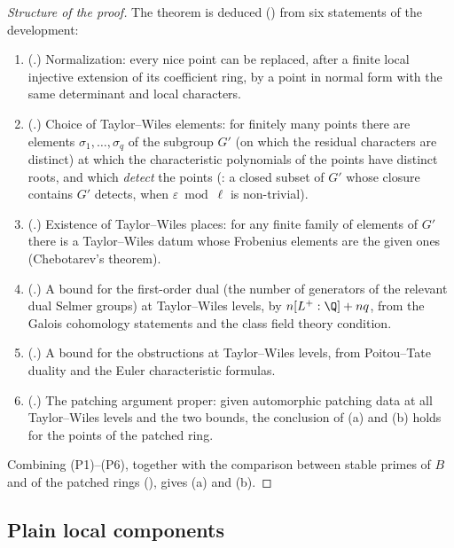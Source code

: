 \begin{proof}[Structure of the proof]
The theorem is deduced () from six statements of the development:
\begin{enumerate}[label=(P\arabic*)]
\item (.) Normalization: every nice point can be replaced, after a finite local injective extension of its coefficient
ring, by a point in normal form with the same determinant and local characters.
\item (.) Choice of Taylor--Wiles elements: for finitely many points there are elements $\sigma_1,\dots,\sigma_q$ of
the subgroup $G'$ (on which the residual characters are distinct) at which the characteristic polynomials of the points have distinct roots, and which
\emph{detect} the points (: a closed subset of $G'$ whose closure contains $G'$ detects, when $\varepsilon\bmod\ell$ is
non-trivial).
\item (.) Existence of Taylor--Wiles places: for any finite family of elements of $G'$ there is a Taylor--Wiles datum
whose Frobenius elements are the given ones (Chebotarev's theorem).
\item (.) A bound for the first-order dual (the number of generators of the relevant dual Selmer groups) at Taylor--Wiles
levels, by $n[L^+:\Q]+nq$, from the Galois cohomology statements and the class field theory condition.
\item (.) A bound for the obstructions at Taylor--Wiles levels, from Poitou--Tate duality and the Euler characteristic
formulas.
\item (.) The patching argument proper: given automorphic patching data at all Taylor--Wiles levels and the two
bounds, the conclusion of (a) and (b) holds for the points of the patched ring.
\end{enumerate}
Combining (P1)--(P6), together with the comparison between stable primes of $B$ and of the patched rings
(), gives (a) and (b).
\end{proof}


\subsection{Plain local components}\label{sec:pf:vwin:plain}

